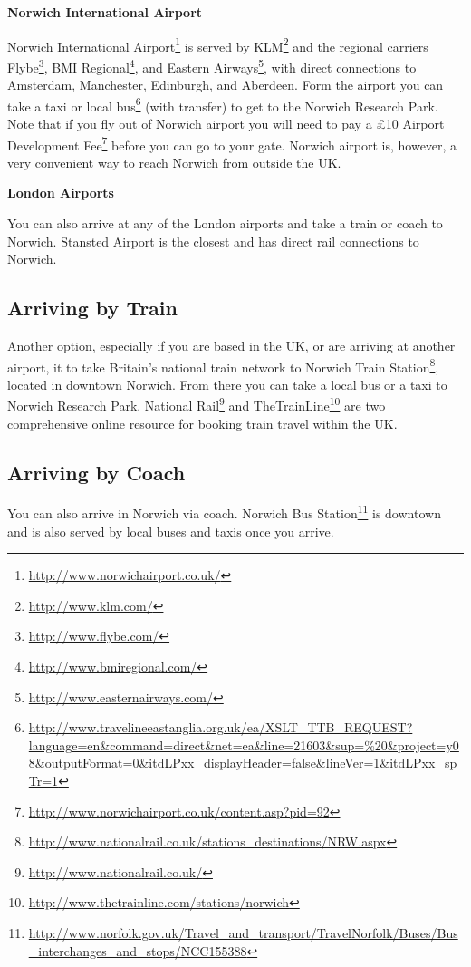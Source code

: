 \documentclass[12pt,]{book}
\let\rmarkdownfootnote\footnote%
\def\footnote{\protect\rmarkdownfootnote}
\renewcommand{\href}[2]{#2\footnote{\url{#1}}}
\theoremstyle{definition}
\theoremstyle{definition}
\theoremstyle{remark}
\begin{document}
\textbf{Norwich International Airport}

\href{http://www.norwichairport.co.uk/}{Norwich International Airport}
is served by \href{http://www.klm.com/}{KLM} and the regional carriers
\href{http://www.flybe.com/}{Flybe},
\href{http://www.bmiregional.com/}{BMI Regional}, and
\href{http://www.easternairways.com/}{Eastern Airways}, with direct
connections to Amsterdam, Manchester, Edinburgh, and Aberdeen. Form the
airport you can take a taxi or
\href{http://www.travelineeastanglia.org.uk/ea/XSLT_TTB_REQUEST?language=en\&command=direct\&net=ea\&line=21603\&sup=\%20\&project=y08\&outputFormat=0\&itdLPxx_displayHeader=false\&lineVer=1\&itdLPxx_spTr=1}{local
bus} (with transfer) to get to the Norwich Research Park. Note that if
you fly out of Norwich airport you will need to pay a
\href{http://www.norwichairport.co.uk/content.asp?pid=92}{£10 Airport
Development Fee} before you can go to your gate. Norwich airport is,
however, a very convenient way to reach Norwich from outside the UK.

\textbf{London Airports}

You can also arrive at any of the London airports and take a train or
coach to Norwich. Stansted Airport is the closest and has direct rail
connections to Norwich.

\subsection*{Arriving by Train}\label{arriving-by-train}

Another option, especially if you are based in the UK, or are arriving
at another airport, it to take Britain's national train network to
\href{http://www.nationalrail.co.uk/stations_destinations/NRW.aspx}{Norwich
Train Station}, located in downtown Norwich. From there you can take a
local bus or a taxi to Norwich Research Park.
\href{http://www.nationalrail.co.uk/}{National Rail} and
\href{http://www.thetrainline.com/stations/norwich}{TheTrainLine} are
two comprehensive online resource for booking train travel within the
UK.

\subsection*{Arriving by Coach}\label{arriving-by-coach}

You can also arrive in Norwich via coach.
\href{http://www.norfolk.gov.uk/Travel_and_transport/TravelNorfolk/Buses/Bus_interchanges_and_stops/NCC155388}{Norwich
Bus Station} is downtown and is also served by local buses and taxis
once you arrive.
\end{document}
